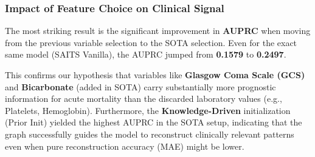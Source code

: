 \subsubsection{Impact of Feature Choice on Clinical Signal}
The most striking result is the significant improvement in \textbf{AUPRC} when moving from the previous variable selection to the SOTA selection. Even for the exact same model (SAITS Vanilla), the AUPRC jumped from \textbf{0.1579} to \textbf{0.2497}. 

This confirms our hypothesis that variables like \textbf{Glasgow Coma Scale (GCS)} and \textbf{Bicarbonate} (added in SOTA) carry substantially more prognostic information for acute mortality than the discarded laboratory values (e.g., Platelets, Hemoglobin). Furthermore, the \textbf{Knowledge-Driven} initialization (Prior Init) yielded the highest AUPRC in the SOTA setup, indicating that the graph successfully guides the model to reconstruct clinically relevant patterns even when pure reconstruction accuracy (MAE) might be lower.

